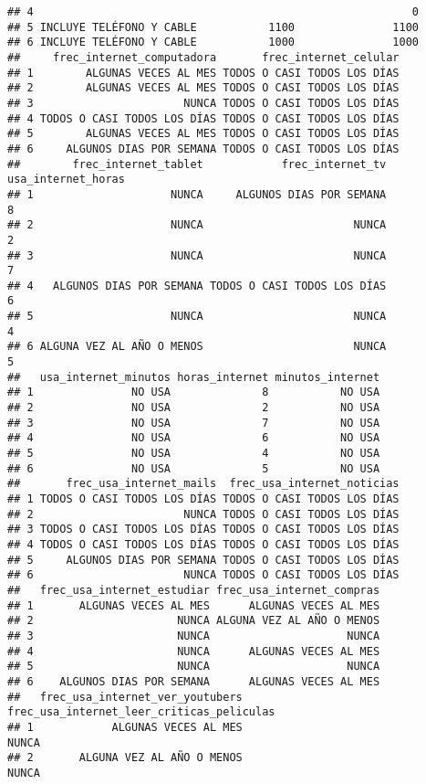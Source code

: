 \documentclass[
]{article}
\begin{document}
\begin{verbatim}
## 4                                                          0
## 5 INCLUYE TELÉFONO Y CABLE           1100               1100
## 6 INCLUYE TELÉFONO Y CABLE           1000               1000
##     frec_internet_computadora       frec_internet_celular
## 1        ALGUNAS VECES AL MES TODOS O CASI TODOS LOS DÍAS
## 2        ALGUNAS VECES AL MES TODOS O CASI TODOS LOS DÍAS
## 3                       NUNCA TODOS O CASI TODOS LOS DÍAS
## 4 TODOS O CASI TODOS LOS DÍAS TODOS O CASI TODOS LOS DÍAS
## 5        ALGUNAS VECES AL MES TODOS O CASI TODOS LOS DÍAS
## 6     ALGUNOS DIAS POR SEMANA TODOS O CASI TODOS LOS DÍAS
##        frec_internet_tablet            frec_internet_tv usa_internet_horas
## 1                     NUNCA     ALGUNOS DIAS POR SEMANA                  8
## 2                     NUNCA                       NUNCA                  2
## 3                     NUNCA                       NUNCA                  7
## 4   ALGUNOS DIAS POR SEMANA TODOS O CASI TODOS LOS DÍAS                  6
## 5                     NUNCA                       NUNCA                  4
## 6 ALGUNA VEZ AL AÑO O MENOS                       NUNCA                  5
##   usa_internet_minutos horas_internet minutos_internet
## 1               NO USA              8           NO USA
## 2               NO USA              2           NO USA
## 3               NO USA              7           NO USA
## 4               NO USA              6           NO USA
## 5               NO USA              4           NO USA
## 6               NO USA              5           NO USA
##       frec_usa_internet_mails  frec_usa_internet_noticias
## 1 TODOS O CASI TODOS LOS DÍAS TODOS O CASI TODOS LOS DÍAS
## 2                       NUNCA TODOS O CASI TODOS LOS DÍAS
## 3 TODOS O CASI TODOS LOS DÍAS TODOS O CASI TODOS LOS DÍAS
## 4 TODOS O CASI TODOS LOS DÍAS TODOS O CASI TODOS LOS DÍAS
## 5     ALGUNOS DIAS POR SEMANA TODOS O CASI TODOS LOS DÍAS
## 6                       NUNCA TODOS O CASI TODOS LOS DÍAS
##   frec_usa_internet_estudiar frec_usa_internet_compras
## 1       ALGUNAS VECES AL MES      ALGUNAS VECES AL MES
## 2                      NUNCA ALGUNA VEZ AL AÑO O MENOS
## 3                      NUNCA                     NUNCA
## 4                      NUNCA      ALGUNAS VECES AL MES
## 5                      NUNCA                     NUNCA
## 6    ALGUNOS DIAS POR SEMANA      ALGUNAS VECES AL MES
##   frec_usa_internet_ver_youtubers frec_usa_internet_leer_criticas_peliculas
## 1            ALGUNAS VECES AL MES                                     NUNCA
## 2       ALGUNA VEZ AL AÑO O MENOS                                     NUNCA

\end{verbatim}
\end{document}

